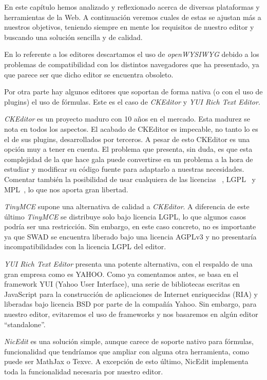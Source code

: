 En este capítulo hemos analizado y reflexionado acerca de diversas plataformas y herramientas de la Web. A continuación veremos cuales de estas se ajustan más a nuestros objetivos, teniendo siempre en mente los requisitos de nuestro editor y buscando una solución sencilla y de calidad.

En lo referente a los editores descartamos el uso de \emph{openWYSIWYG} debido a los problemas de compatibilidad con los distintos navegadores que ha presentado, ya que parece ser que dicho editor se encuentra obsoleto.

Por otra parte hay algunos editores que soportan de forma nativa (o con el uso de plugins) el uso de fórmulas. Este es el caso de \emph{CKEditor} y \emph{YUI Rich Text Editor}.

\emph{CKEditor} es un proyecto maduro con 10 años en el mercado. Esta madurez se nota en todos los aspectos. El acabado de CKEditor es impecable, no tanto lo es el de sus plugins, desarrollados por terceros. A pesar de esto CKEditor es una opción muy a tener en cuenta. El problema que presenta, sin duda, es que esta complejidad de la que hace gala puede convertirse en un problema a la hora de estudiar y modificar su código fuente para adaptarlo a nuestras necesidades. Comentar también la posibilidad de usar cualquiera de las licencias ~\cite{GPL:gpl}, LGPL~\cite{LGPL:lgpl} y MPL~\cite{MPL:mpl}, lo que nos aporta gran libertad.
      
\emph{TinyMCE} supone una alternativa de calidad a \emph{CKEditor}. A diferencia de este último \emph{TinyMCE} se distribuye solo bajo licencia LGPL, lo que algunos casos podría ser una restricción. Sin embargo, en este caso concreto, no es importante ya que SWAD se encuentra liberado bajo una licencia AGPLv3 y no presentaría incompatibilidades con la licencia LGPL del editor. 

\emph{YUI Rich Text Editor} presenta una potente alternativa, con el respaldo de una gran empresa como es YAHOO. Como ya comentamos antes, se basa en el framework YUI (Yahoo User Interface), una serie de bibliotecas escritas en JavaScript para la construcción de aplicaciones de Internet enriquecidas (RIA) y liberadas bajo licencia BSD por parte de la compañía Yahoo. Sin embargo, para nuestro editor, evitaremos el uso de frameworks y nos basaremos en algún editor ``standalone''.

\emph{NicEdit} es una solución simple, aunque carece de soporte nativo para fórmulas, funcionalidad que tendríamos que ampliar con alguna otra herramienta, como puede ser MathJax o Texvc. A excepción de esto último, NicEdit implementa toda la funcionalidad necesaria por nuestro editor.

